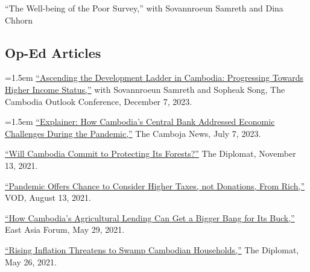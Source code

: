 \documentclass[10pt,a4paper]{article}
\begin{document}
	``The Well-being of the Poor Survey,'' with Sovannroeun Samreth and Dina Chhorn

\subsection*{Op-Ed Articles}

	\hangindent=1.5em
	\href{https://coc2023.cdri.org.kh/ascending-the-development-ladder-in-cambodia-progressing-towards-higher-income-status/}{``Ascending the Development Ladder in Cambodia: Progressing Towards Higher Income Status,''} with Sovannroeun Samreth and Sopheak Song, The Cambodia Outlook Conference, December 7, 2023.\\ \vspace{-.5em}
	
	\hangindent=1.5em
	\href{https://cambojanews.com/explainer-how-cambodias-central-bank-addressed-economic-challenges-during-the-pandemic/}{``Explainer: How Cambodia's Central Bank Addressed Economic Challenges During the Pandemic,''} The Camboja News, July 7, 2023.\\ \vspace{-.5em}
	
	\href{https://thediplomat.com/2021/11/will-cambodia-commit-to-protecting-its-forests/}{``Will Cambodia Commit to Protecting Its Forests?''} The Diplomat, November 13, 2021.\\ \vspace{-.5em}

	\href{https://vodenglish.news/opinion-pandemic-offers-chance-to-consider-higher-taxes-not-donations-from-rich/}{``Pandemic Offers Chance to Consider Higher Taxes, not Donations, From Rich,''} VOD, August 13, 2021.\\ \vspace{-.5em}

	\href{https://www.eastasiaforum.org/2021/05/29/how-cambodias-agricultural-lending-can-get-a-bigger-bang-for-its-buck/}{``How Cambodia's Agricultural Lending Can Get a Bigger Bang for Its Buck,''} East Asia Forum, May 29, 2021.\\ \vspace{-.5em}

	\href{https://thediplomat.com/2021/05/rising-inflation-threatens-to-swamp-cambodian-households/}{``Rising Inflation Threatens to Swamp Cambodian Households,''} The Diplomat, May 26, 2021.\\ \vspace{-.5em}
\end{document}
